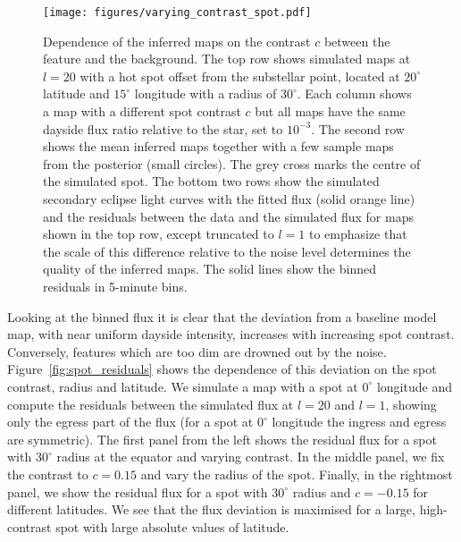 \documentclass[12pt,dvipsnames]{report}
\begin{document}
\begin{figure}[t!]
    \begin{centering}
        \texttt{[image: figures/varying\_contrast\_spot.pdf]}
        \caption{
            Dependence of the inferred maps on the contrast $c$ between the feature and the background.
            The top row shows simulated maps at $l=20$ with a hot spot offset from the substellar point, located at
            $20^\circ$ latitude and $15^\circ$ longitude with a radius of $30^\circ$.
            Each column shows a map with a different spot contrast $c$ but all maps have the same dayside
            flux ratio relative to the star, set to $10^{-3}$.
            The second row shows the mean inferred maps together with a few sample maps from the posterior
            (small circles).
            The grey cross marks the centre of the simulated spot.
            The bottom two rows show the simulated secondary eclipse light curves with the fitted flux
            (solid orange line) and the residuals between the data and the simulated flux for maps
            shown in the top row, except truncated to $l=1$ to emphasize that the scale of this difference
            relative to the noise level determines the quality of the inferred maps.
            The solid lines show the binned residuals in 5-minute bins.
        }
        \label{fig:varying_contrast_spot}
    \end{centering}
\end{figure}

Looking at the binned flux it is clear that the deviation from a baseline model map,
with near uniform dayside intensity, increases with increasing spot contrast.
Conversely, features which are too dim are drowned out by the noise. 
Figure~\ref{fig:spot_residuals} shows the dependence of this deviation on the
spot contrast, radius and latitude. We simulate a map with a spot at $0^\circ$
longitude and compute the residuals between the simulated flux at $l=20$ and
$l=1$, showing only the egress part of the flux (for a spot at $0^\circ$
longitude the ingress and egress are symmetric). The first panel from the left
shows the residual flux for a spot with $30^\circ$ radius at the equator and 
varying contrast. In the middle panel, we fix the contrast to $c=0.15$ and vary
the radius of the spot. Finally, in the rightmost panel, we show the residual
flux for a spot with $30^\circ$ radius and $c=-0.15$ for different latitudes. We 
see that the flux deviation is maximised for a large, high-contrast spot
with large absolute values of latitude.
\end{document}
